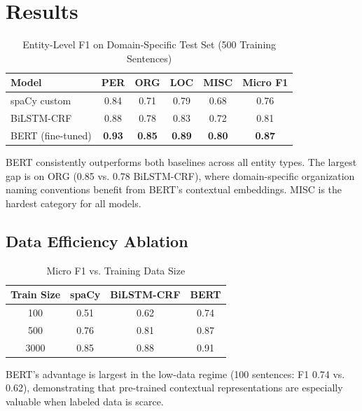 \documentclass[conference]{IEEEtran}
\begin{document}
\section{Results}

\begin{table}[htbp]
\caption{Entity-Level F1 on Domain-Specific Test Set (500 Training Sentences)}
\begin{center}
\begin{tabular}{|l|c|c|c|c|c|}
\hline
\textbf{Model} & \textbf{PER} & \textbf{ORG} & \textbf{LOC} & \textbf{MISC} & \textbf{Micro F1} \\
\hline
spaCy custom & 0.84 & 0.71 & 0.79 & 0.68 & 0.76 \\
BiLSTM-CRF & 0.88 & 0.78 & 0.83 & 0.72 & 0.81 \\
BERT (fine-tuned) & \textbf{0.93} & \textbf{0.85} & \textbf{0.89} & \textbf{0.80} & \textbf{0.87} \\
\hline
\end{tabular}
\label{tab:results}
\end{center}
\end{table}

BERT consistently outperforms both baselines across all entity types. The largest gap is on ORG (0.85 vs. 0.78 BiLSTM-CRF), where domain-specific organization naming conventions benefit from BERT's contextual embeddings. MISC is the hardest category for all models.

\subsection{Data Efficiency Ablation}

\begin{table}[htbp]
\caption{Micro F1 vs. Training Data Size}
\begin{center}
\begin{tabular}{|c|c|c|c|}
\hline
\textbf{Train Size} & \textbf{spaCy} & \textbf{BiLSTM-CRF} & \textbf{BERT} \\
\hline
100 & 0.51 & 0.62 & 0.74 \\
500 & 0.76 & 0.81 & 0.87 \\
3000 & 0.85 & 0.88 & 0.91 \\
\hline
\end{tabular}
\label{tab:ablation}
\end{center}
\end{table}

BERT's advantage is largest in the low-data regime (100 sentences: F1 0.74 vs. 0.62), demonstrating that pre-trained contextual representations are especially valuable when labeled data is scarce.
\end{document}

